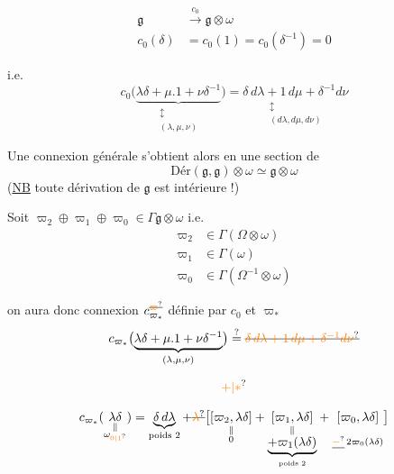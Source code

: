 \[ \begin{aligned}
 \mathfrak g&\xrightarrow{c_0}\mathfrak g\otimes\omega\\
 c_0(\delta)&=c_0(1)=c_0(\delta^{-1})=0
 \end{aligned} \]

i.e.
\[ c_0\bigl(\underbrace{\lambda\delta+\mu.1+\nu\delta^{-1}}_{\substack{\updownarrow\\(\lambda,\mu,\nu)}}\bigr)=\underset{\substack{\updownarrow\\(d\lambda,d\mu,d\nu)}}{\delta\,d\lambda+1\,d\mu+\delta^{-1}d\nu} \]

Une connexion générale s'obtient alors en  une section de
\[ \mathrm{Dér}(\mathfrak g,\mathfrak g)\otimes\omega\simeq\mathfrak g\otimes\omega \]
(\uline{NB} toute dérivation de $\mathfrak g$ est intérieure !)

Soit \inserted{$\varpi_{\unsure{*|\bullet}}={}$} $\varpi_2\oplus\varpi_1\oplus\varpi_0\in\Gamma\mathfrak g\otimes\omega$ i.e.
\[ \begin{aligned}
 \varpi_2&\in\Gamma(\Omega\otimes\omega)\\
 \varpi_1&\in\Gamma(\omega)\\
 \varpi_0&\in\Gamma(\Omega^{-1}\otimes\omega)
 \end{aligned} \]

on aura donc  connexion $c^{\deleted{\unsure{\varpi}}}_{\varpi_*}$ définie par $c_0$ et $\varpi_*$ 
\[ c_{\varpi_*}\bigl(\underbrace{\lambda\delta+\mu.1+\nu\delta^{-1}}_{(\lambda,\mu,\nu)}\bigr)\overset{?}{=}\deleted{\unsure{\delta\,d\lambda+1\,d\mu+\delta^{-1}d\nu}} \]

\[ \unsure{+|\ast} \]


\[ c_{\varpi_*}(\underset{\substack{\Vert\\\omega_{\unsure{0|1}}}}{\lambda\delta})
 =\underbrace{\delta\,d\lambda}_{\text{poids 2}}+
 \deleted{\unsure{\lambda}}\bigl[\underset{\substack{\Vert\\0}}{[\varpi_2,\lambda\delta]}+
 \underset{\substack{\Vert\\\underbrace{+\varpi_1(\lambda\delta)}_{\text{poids 2}}}}{[\varpi_1,\lambda\delta]}+
 \underset{\substack{\phantom{\Vert}\\\deleted{\unsure{-}}\,2\varpi_0(\lambda\delta)}}{[\varpi_0,\lambda\delta]}\bigr] \]

